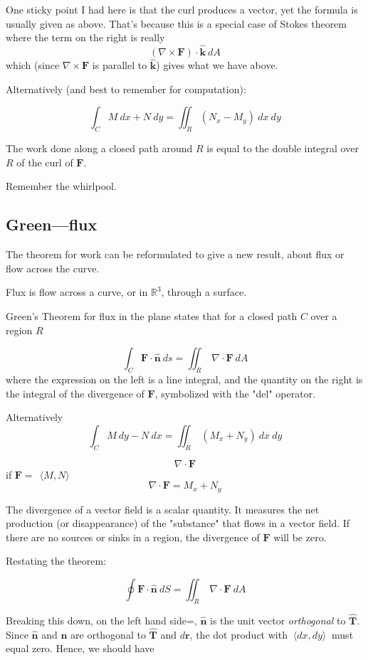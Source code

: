 \documentclass[11pt, oneside]{article}
\begin{document}
One sticky point I had here is that the curl produces a vector, yet the formula is usually given as above.  That's because this is a special case of Stokes theorem where the term on the right is really 
\[ (\nabla \times \mathbf{F}) \cdot \hat{\mathbf{k}} \ dA \]
which (since $\nabla \times \mathbf{F} $ is parallel to $\hat{\mathbf{k}}$) gives what we have above.

Alternatively (and best to remember for computation):

\[ \int_C M \ dx + N \ dy = \iint_R (N_x - M_y) \ dx \ dy \]

The work done along a closed path around $R$ is equal to the double integral over $R$ of the curl of $\mathbf{F}$.  

Remember the whirlpool.

\subsection*{Green---flux}
The theorem for work can be reformulated to give a new result, about flux or flow across the curve.

Flux is flow across a curve, or in $\mathbb{R}^3$, through a surface.

Green's Theorem for flux in the plane states that for a closed path $C$ over a region $R$

\[ \int_C \mathbf{F} \cdot \hat{\mathbf{n}} \  ds = \iint_R \ \nabla \cdot \mathbf{F} \ dA \]
where the expression on the left is a line integral, and the quantity on the right is the integral of the divergence of $\mathbf{F}$, symbolized with the "del" operator.

Alternatively
\[ \int_C M \ dy - N \ dx =  \iint_R \ (M_x + N_y) \ dx \ dy \]

\[ \nabla \cdot \mathbf{F} \]
if $\mathbf{F} = \ \ \langle M,N \rangle \ $
\[ \nabla \cdot \mathbf{F} = M_x + N_y \]

The divergence of a vector field is a scalar quantity.  It measures the net production (or disappearance) of the "substance" that flows in a vector field.  If there are no sources or sinks in a region, the divergence of $\mathbf{F}$ will be zero.

Restating the theorem:

\[ \oint \mathbf{F} \cdot \hat{\mathbf{n}} \ dS  = \iint_R \ \nabla \cdot \mathbf{F} \ dA \]

Breaking this down, on the left hand side=, $\hat{\mathbf{n}}$ is the unit vector \emph{orthogonal} to $\hat{\mathbf{T}}$.  Since $\hat{\mathbf{n}}$ and $\mathbf{n}$ are orthogonal to $\hat{\mathbf{T}}$ and $d\mathbf{r}$, the dot product with $\ \langle dx,dy \rangle \ $ must equal zero.  Hence, we should have
\end{document}
